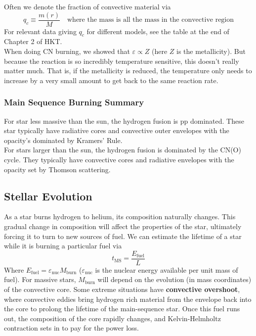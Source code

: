 \documentclass[10pt]{article}
\numberwithin{equation}{section}
\newcommand{\n}{\noindent}
\begin{document}
    \n Often we denote the fraction of convective material via
    \begin{equation}
      \label{eq:192}
      q_c\equiv \frac{m(r)}{M} \quad\textrm{where the mass is all the
        mass in the convective region}
    \end{equation}
    For relevant data giving $q_c$ for different models, see the table
    at the end of Chapter 2 of HKT.\\

    \n When doing CN burning, we showed that $\varepsilon\propto Z$
    (here $Z$ is the metallicity). But because the reaction is so
    incredibly temperature sensitive, this doesn't really matter
    much. That is, if the metallicity is reduced, the temperature only
    needs to increase by a very small amount to get back to the same
    reaction rate.

    \subsubsection{Main Sequence Burning Summary}
    \label{sec:main-sequ-burn}

    For star less massive than the sun, the hydrogen fusion is pp
    dominated. These star typically have radiative cores and
    convective outer envelopes with the opacity's dominated by
    Kramers' Rule.\\

    \n For stars larger than the sun, the hydrogen fusion is dominated
    by the CN(O) cycle. They typically have convective cores and
    radiative envelopes with the opacity set by Thomson scattering.

    \subsection{Stellar Evolution}
    \label{sec:stellar-evolution}

    As a star burns hydrogen to helium, its composition naturally
    changes. This gradual change in composition will affect the
    properties of the star, ultimately forcing it to turn to new
    sources of fuel. We can estimate the lifetime of a star while it
    is burning a particular fuel via
    \begin{equation}
      \label{eq:193}
      t_{\mathrm{MS}}=\frac{E_{\mathrm{fuel}}}{L}
    \end{equation}
    Where
    $E_{\mathrm{fuel}}=\varepsilon_{\mathrm{nuc}}M_{\mathrm{burn}}$
    ($\varepsilon_{\mathrm{nuc}}$ is the nuclear energy available per
    unit mass of fuel). For massive stars, $M_{\mathrm{burn}}$ will
    depend on the evolution (in mass coordinates) of the convective
    core. Some extreme situations have \textbf{convective overshoot},
    where convective eddies bring hydrogen rich material from the
    envelope back into the core to prolong the lifetime of the
    main-sequence star. Once this fuel runs out, the composition of
    the core rapidly changes, and Kelvin-Helmholtz contraction sets in
    to pay for the power loss.\\
\end{document}
